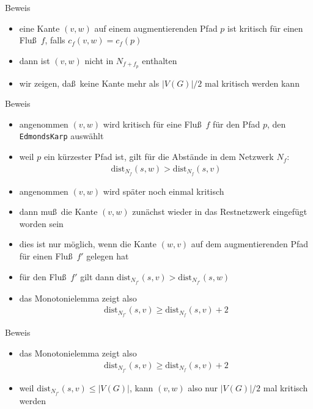 \documentclass[aspectratio=1610, 11pt]{beamer}
\newcommand\dist{\mathrm{dist}}
\begin{document}
\begin{frame}
\begin{overprint}
\begin{exampleblock}{Beweis}
\begin{itemize}
				\item eine Kante $(v,w)$ auf einem augmentierenden Pfad $p$ ist \alert{kritisch} f\"ur einen Flu\ss\ $f$, falls $c_f(v,w)=c_f(p)$
				\item dann ist $(v,w)$ nicht in $N_{f+f_p}$ enthalten
				\item wir zeigen, da\ss\ keine Kante mehr als $|V(G)|/2$ mal kritisch werden kann
			\end{itemize}
		\end{exampleblock}
		\begin{exampleblock}{Beweis}
			\begin{itemize}
				\item angenommen $(v,w)$ wird kritisch f\"ur eine Flu\ss\ $f$ f\"ur den Pfad $p$, den {\tt EdmondsKarp} ausw\"ahlt
				\item weil $p$ ein k\"urzester Pfad ist, gilt f\"ur die Abst\"ande in dem Netzwerk $N_f$:
					\begin{align*}
						\dist_{N_f}(s,w)>\dist_{N_f}(s,v)
					\end{align*}
				\item angenommen $(v,w)$ wird sp\"ater noch einmal kritisch
				\item dann mu\ss\ die Kante $(v,w)$ zun\"achst wieder in das Restnetzwerk eingef\"ugt worden sein
				\item dies ist nur m\"oglich, wenn die Kante $(w,v)$ auf dem augmentierenden Pfad f\"ur einen Flu\ss\ $f'$ gelegen hat
				\item f\"ur den Flu\ss\ $f'$ gilt dann $\dist_{N_{f'}}(s,v)>\dist_{N_{f'}}(s,w)$
				\item das Monotonielemma zeigt also
					\begin{align*}
						\dist_{N_{f'}}(s,v)\geq\dist_{N_f}(s,v)+2
					\end{align*}
			\end{itemize}
		\end{exampleblock}
		\begin{exampleblock}{Beweis}
			\begin{itemize}
				\item das Monotonielemma zeigt also
					\begin{align*}
						\dist_{N_{f'}}(s,v)\geq\dist_{N_f}(s,v)+2
					\end{align*}
				\item weil $\dist_{N_{f'}}(s,v)\leq|V(G)|$, kann $(v,w)$ also nur $|V(G)|/2$ mal kritisch werden
			\end{itemize}
		\end{exampleblock}
	\end{overprint}
\end{frame}
\end{document}
